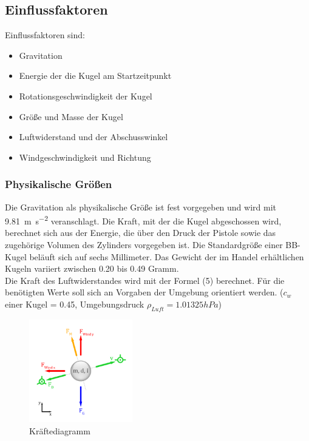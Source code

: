 \documentclass{scrartcl}
\begin{document}
\subsection{Einflussfaktoren}

Einflussfaktoren sind: 
\begin{itemize}
  \item Gravitation
  \item Energie der die Kugel am Startzeitpunkt
  \item Rotationsgeschwindigkeit der Kugel
  \item Größe und Masse der Kugel
  \item Luftwiderstand und der Abschusswinkel
  \item Windgeschwindigkeit und Richtung
\end{itemize}

\subsubsection{Physikalische Größen}

Die Gravitation als physikalische Größe ist fest vorgegeben und wird mit \SI{9.81}{\metre\per\square\second} veranschlagt. 
Die Kraft, mit der die Kugel abgeschossen wird, berechnet sich aus der Energie, die über den Druck der Pistole sowie das zugehörige Volumen des Zylinders vorgegeben ist. 
Die Standardgröße einer BB-Kugel beläuft sich auf sechs Millimeter. 
Das Gewicht der im Handel erhältlichen Kugeln variiert zwischen \num{0.20} bis \num{0.49} Gramm. \\
Die Kraft des Luftwiderstandes wird mit der Formel (5) berechnet. Für die benötigten Werte soll sich an Vorgaben der Umgebung orientiert werden. ($c_{w}$ einer Kugel = 0.45, Umgebungsdruck $\rho_{Luft} = 1.01325 hPa$)

\begin{figure}
    \centering %
    \includegraphics[width=0.4\textwidth]{airsoft_v3}\par
    \caption{Kräftediagramm} %
\end{figure}
\end{document}
